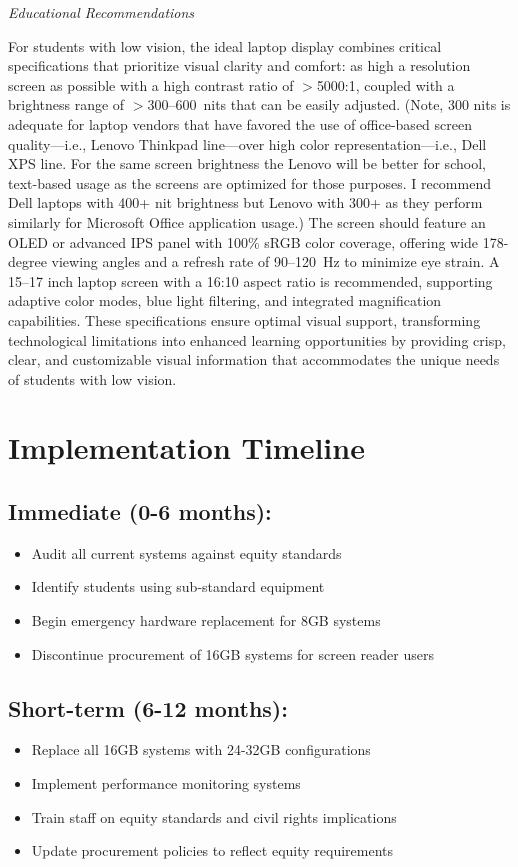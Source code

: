 \emph{Educational Recommendations}

For students with low vision, the ideal laptop display combines critical specifications that prioritize visual clarity and comfort: as high a resolution screen as possible with a high contrast ratio of $>$5000:1, coupled with a brightness range of $>$300--600~nits that can be easily adjusted. (Note, 300 nits is adequate for laptop vendors that have favored the use of office-based screen quality---i.e., Lenovo Thinkpad line---over high color representation---i.e., Dell XPS line. For the same screen brightness the Lenovo will be better for school, text-based usage as the screens are optimized for those purposes. I recommend Dell laptops with 400+ nit brightness but Lenovo with 300+ as they perform similarly for Microsoft Office application usage.) The screen should feature an OLED or advanced IPS panel with 100\% sRGB color coverage, offering wide 178-degree viewing angles and a refresh rate of 90--120~Hz to minimize eye strain. A 15--17 inch laptop screen with a 16:10 aspect ratio is recommended, supporting adaptive color modes, blue light filtering, and integrated magnification capabilities. These specifications ensure optimal visual support, transforming technological limitations into enhanced learning opportunities by providing crisp, clear, and customizable visual information that accommodates the unique needs of students with low vision.

\section{Implementation Timeline}\label{implementation-timeline}

\subsection{Immediate (0-6 months):}
\begin{itemize}
\item Audit all current systems against equity standards
\item Identify students using sub-standard equipment
\item Begin emergency hardware replacement for 8GB systems
\item Discontinue procurement of 16GB systems for screen reader users
\end{itemize}

\subsection{Short-term (6-12 months):}
\begin{itemize}
\item Replace all 16GB systems with 24-32GB configurations
\item Implement performance monitoring systems
\item Train staff on equity standards and civil rights implications
\item Update procurement policies to reflect equity requirements
\end{itemize}

